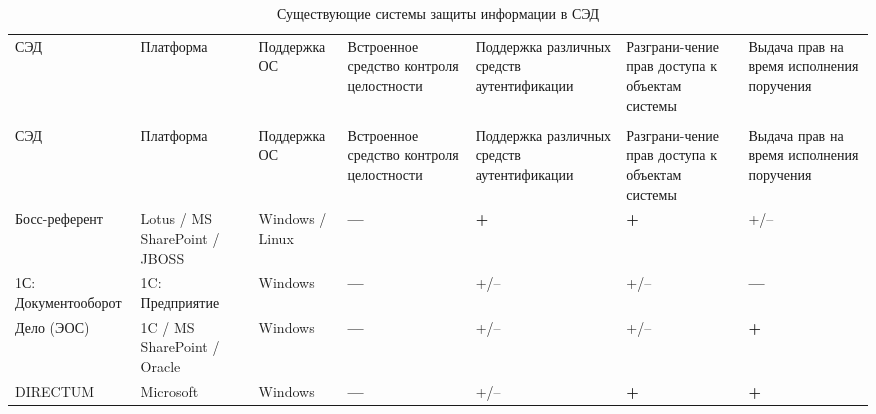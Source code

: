  \begin{center}
 \renewcommand\multirowsetup{\centering}
 \begin{longtable}[h]{| >{\centering}m{2.5cm} | >{\centering}m{2cm} | >{\centering}m{2cm} | >{\centering}m{2cm} | >{\centering}m{2cm} | >{\centering}m{2cm} | >{\centering}m{2cm} |}
  \captionsetup{justification=raggedright}
  \caption{Существующие системы защиты информации в СЭД} \label{table:products} \tabularnewline
  \hline

 \rowcolor{Gray} СЭД   & Платформа & Поддержка ОС & Встроенное средство контроля целостности & Поддержка различных средств аутентификации & Разграни-чение прав доступа к объектам системы & Выдача прав на время исполнения поручения \tabularnewline \hline \endfirsthead   \hline
 \multicolumn{7}{|c|}{\small\slshape (продолжение таблицы \ref{table:products})}        \tabularnewline \hline
\rowcolor{Gray} СЭД   & Платформа & Поддержка ОС & Встроенное средство контроля целостности & Поддержка различных средств аутентификации & Разграни-чение прав доступа к объектам системы & Выдача прав на время исполнения поручения \tabularnewline \hline
                                              \endhead        \hline
                                              \endfoot        \hline
                                              \endlastfoot

  Босс-референт & \color{Green} Lotus / MS SharePoint / JBOSS & \color{Green} Windows / Linux & \color{Red} \textbf{---} &  \color{Green} \textbf{+} & \color{Green} \textbf{+} & +/-- \tabularnewline \hline

  1С: Документооборот & \color{Red} 1C: Предприятие & \color{Red} Windows & \color{Red} \textbf{---} & +/-- & +/-- & \color{Red} \textbf{---} \tabularnewline \hline




  Дело (ЭОС) & \color{Green} 1C / MS SharePoint / Oracle & \color{Red} Windows & \color{Red} \textbf{---} & +/--  & +/-- & \color{Green} \textbf{+} \tabularnewline \hline

  DIRECTUM & \color{Red} Microsoft & \color{Red} Windows  & \color{Red} \textbf{---} & +/-- & \color{Green} \textbf{+} & \color{Green} \textbf{+} \tabularnewline \hline


\end{longtable}
\end{center}
